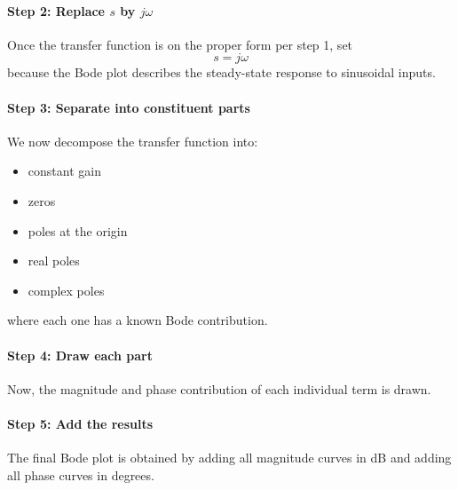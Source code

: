 \paragraph{Step 2: Replace $s$ by $j \omega$}
Once the transfer function is on the proper form per step 1, set
\begin{equation*}
  s = j \omega
\end{equation*}
because the Bode plot describes the steady-state response to sinusoidal inputs.

\paragraph{Step 3: Separate into constituent parts}
We now decompose the transfer function into:
\begin{itemize}
  \item constant gain
  \item zeros
  \item poles at the origin
  \item real poles
  \item complex poles
\end{itemize}
where each one has a known Bode contribution.

\paragraph{Step 4: Draw each part}
Now, the magnitude and phase contribution of each individual term is drawn.

\paragraph{Step 5: Add the results}
The final Bode plot is obtained by adding all magnitude curves in \unit{\dB} and adding all phase curves in degrees.

